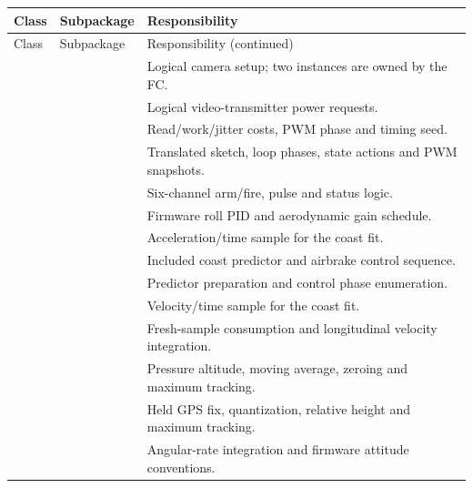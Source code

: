 \small
\begin{longtable}{@{}>{\raggedright\arraybackslash}L{5.65cm}>{\raggedright\arraybackslash}L{2.1cm}>{\raggedright\arraybackslash}L{7.4cm}@{}}
\toprule Class & Subpackage & Responsibility\\\midrule
\endfirsthead
\toprule Class & Subpackage & Responsibility (continued)\\\midrule
\endhead
\bottomrule
\endfoot
{} &  & Logical camera setup; two instances are owned by the FC.\\
 &  & Logical video-transmitter power requests.\\
 &  & Read/work/jitter costs, PWM phase and timing seed.\\
 &  & Translated sketch, loop phases, state actions and PWM snapshots.\\
 &  & Six-channel arm/fire, pulse and status logic.\\
 &  & Firmware roll PID and aerodynamic gain schedule.\\
 & \newline{} & Acceleration/time sample for the coast fit.\\
 & \newline{} & Included coast predictor and airbrake control sequence.\\
 & \newline{} & Predictor preparation and control phase enumeration.\\
 & \newline{} & Velocity/time sample for the coast fit.\\
 &  & Fresh-sample consumption and longitudinal velocity integration.\\
 &  & Pressure altitude, moving average, zeroing and maximum tracking.\\
 &  & Held GPS fix, quantization, relative height and maximum tracking.\\
 &  & Angular-rate integration and firmware attitude conventions.\\

\end{longtable}
